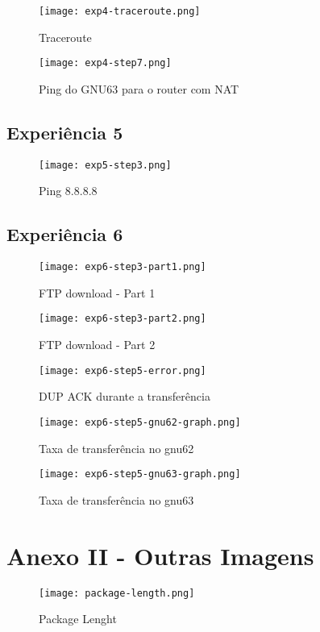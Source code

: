 \documentclass[article, a4paper, 11pt, oneside]{memoir}
\begin{document}
\begin{figure}[h]
	\centering
\texttt{[image: exp4-traceroute.png]}
\caption{Traceroute}
\end{figure}

\begin{figure}[h]
	\centering
\texttt{[image: exp4-step7.png]}
\caption{Ping do GNU63 para o router com NAT}
\end{figure}

\subsection{Experiência 5}
\begin{figure}[h]
	\centering
\texttt{[image: exp5-step3.png]}
\caption{Ping 8.8.8.8}
\end{figure}

\newpage
\subsection{Experiência 6}
\begin{figure}[h]
	\centering
\texttt{[image: exp6-step3-part1.png]}
\caption{FTP download - Part 1}
\end{figure}

\begin{figure}[h]
	\centering
\texttt{[image: exp6-step3-part2.png]}
\caption{FTP download - Part 2}
\end{figure}

\begin{figure}[h]
	\centering
\texttt{[image: exp6-step5-error.png]}
\caption{DUP ACK durante a transferência}
\end{figure}

\newpage
\begin{figure}[h]
	\centering
\texttt{[image: exp6-step5-gnu62-graph.png]}
\caption{Taxa de transferência no gnu62}
\end{figure}

\begin{figure}[h]
	\centering
\texttt{[image: exp6-step5-gnu63-graph.png]}
\caption{Taxa de transferência no gnu63}
\end{figure}

\newpage
\section{Anexo II - Outras Imagens}
\begin{figure}[h]
	\centering
\texttt{[image: package-length.png]}
\caption{Package Lenght}
\end{figure}
\end{document}
